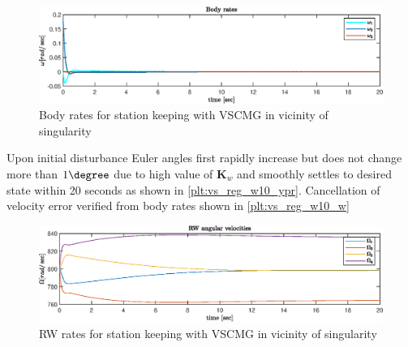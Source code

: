 \begin{figure}[H]
     \centering
    \includegraphics[width=0.9\columnwidth]{figures/plots/VSCMG/vs_reg_w10_w.eps}
    \caption{Body rates for station keeping with VSCMG in vicinity of singularity}
    \label{plt:vs_reg_w10_w}
\end{figure}
\noindent Upon initial disturbance Euler angles first rapidly increase but does not change more than $1 \degree$ due to high value of $ \textbf{K}_w $ and smoothly settles to desired state within 20 seconds as shown in \autoref{plt:vs_reg_w10_ypr}. Cancellation of velocity error verified from body rates shown in \autoref{plt:vs_reg_w10_w}

\begin{figure}[H]
     \centering
    \includegraphics[width=0.9\columnwidth]{figures/plots/VSCMG/vs_reg_w10_Om.eps}
    \caption{RW rates for station keeping with VSCMG in vicinity of singularity}
    \label{plt:vs_reg_w10_Om}
\end{figure}

